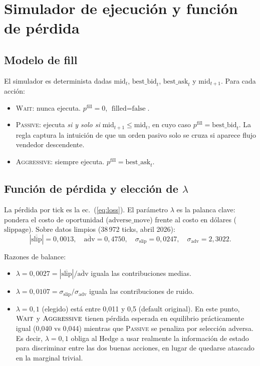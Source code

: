 \documentclass[journal,onecolumn,11pt]{IEEEtran}
\begin{document}
\section{Simulador de ejecución y función de pérdida}\label{sec:simulador}

\subsection{Modelo de fill}

El simulador es determinista dadas $\text{mid}_t$, $\text{best\_bid}_t$,
$\text{best\_ask}_t$ y $\text{mid}_{t+1}$. Para cada acción:
\begin{itemize}
\item \textsc{Wait}: nunca ejecuta. $p^{\text{fill}} = 0$, $\text{filled}=\text{false}$.
\item \textsc{Passive}: ejecuta \emph{si y solo si} $\text{mid}_{t+1} \leq \text{mid}_t$,
       en cuyo caso $p^{\text{fill}} = \text{best\_bid}_t$. La regla
       captura la intuición de que un orden pasivo solo se cruza si
       aparece flujo vendedor descendente.
\item \textsc{Aggressive}: siempre ejecuta. $p^{\text{fill}} = \text{best\_ask}_t$.
\end{itemize}

\subsection{Función de pérdida y elección de $\lambda$}

La pérdida por tick es la ec.~(\ref{eq:loss}). El parámetro $\lambda$
es la palanca clave: pondera el costo de oportunidad
($\text{adverse\_move}$) frente al costo en dólares
($\text{slippage}$). Sobre datos limpios (38\,972 ticks, abril 2026):
\[
|\overline{\text{slip}}|=0{,}0013,\quad
\overline{\text{adv}}=0{,}4750,\quad
\sigma_{\text{slip}}=0{,}0247,\quad
\sigma_{\text{adv}}=2{,}3022.
\]

\noindent
Razones de balance:
\begin{itemize}
\item $\lambda=0{,}0027 = |\overline{\text{slip}}|/\overline{\text{adv}}$
      iguala las contribuciones medias.
\item $\lambda=0{,}0107 = \sigma_{\text{slip}}/\sigma_{\text{adv}}$
      iguala las contribuciones de ruido.
\item $\lambda=0{,}1$ (elegido) está entre 0{,}011 y 0{,}5 (default
      original). En este punto, $\textsc{Wait}$ y $\textsc{Aggressive}$
      tienen pérdida esperada en equilibrio prácticamente igual
      (0{,}040 vs 0{,}044) mientras que \textsc{Passive} se penaliza
      por selección adversa. Es decir, $\lambda=0{,}1$ obliga al
      Hedge a usar realmente la información de estado para discriminar
      entre las dos buenas acciones, en lugar de quedarse atascado en
      la marginal trivial.
\end{itemize}
\end{document}
